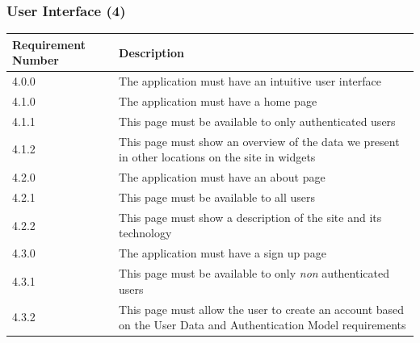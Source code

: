 \documentclass[12pt]{article}
\begin{document}
\subsubsection{User Interface (4)}

\setlength{\tabcolsep}{1cm}
\begin{longtable}{|l|p{8cm}|}
    \hline
    Requirement Number & Description                                                                                                     \\

    \hline\hline
    4.0.0              & The application must have an intuitive user interface                                                           \\

    \hline\hline
    4.1.0              & The application must have a home page                                                                           \\
    \hline
    4.1.1              & This page must be available to only authenticated users                                                         \\
    \hline
    4.1.2              & This page must show an overview of the data we present in other locations on the site in widgets                \\

    \hline\hline
    4.2.0              & The application must have an about page                                                                         \\
    \hline
    4.2.1              & This page must be available to all users                                                                        \\
    \hline
    4.2.2              & This page must show a description of the site and its technology                                                \\
    \hline

    \hline\hline
    4.3.0              & The application must have a sign up page                                                                        \\
    \hline
    4.3.1              & This page must be available to only \textit{non} authenticated users                                            \\
    \hline
    4.3.2              & This page must allow the user to create an account based on the User Data and Authentication Model requirements \\
    \hline


\end{longtable}
\end{document}
